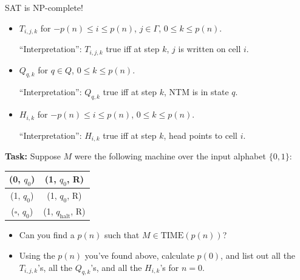 \documentclass{beamer}
\begin{document}
\begin{frame}{SAT is NP-complete!}
\begin{itemize}
    \item $T_{i, j, k}$ for $-p(n) \leq i \leq p(n)$, $j \in \Gamma$, $0 \leq k \leq p(n)$.\pause
    
    ``Interpretation'': $T_{i, j, k}$ true iff at step $k$, $j$ is written on cell $i$.\pause
    \item $Q_{q, k}$ for $q \in Q$, $0 \leq k \leq p(n)$.\pause
    
    ``Interpretation'': $Q_{q, k}$ true iff at step $k$, NTM is in state $q$.\pause
    \item $H_{i, k}$ for $-p(n) \leq i \leq p(n)$, $0 \leq k \leq p(n)$.\pause
    
    ``Interpretation'': $H_{i, k}$ true iff at step $k$, head points to cell $i$.\pause
\end{itemize}

\textbf{Task:} Suppose $M$ were the following machine over the input alphabet $\{0,1\}$:
\begin{center}
    \begin{tabular}{c|c}
        (0, $q_0$) &  (1, $q_0$, R)\\
        \hline
        (1, $q_0$) &  (1, $q_0$, R)\\
        \hline
        ($\square$, $q_0$) &  (1, $q_\text{halt}$, R)\\
    \end{tabular}
\end{center}

\begin{itemize}
    \item Can you find a $p(n)$ such that $M \in \mathrm{TIME}(p(n))$? \pause
    \item Using the $p(n)$ you've found above, calculate $p(0)$, and list out all the $T_{i, j, k}$'s, all the $Q_{q, k}$'s, and all the $H_{i, k}$'s for $n = 0$.
\end{itemize}

\end{frame}
\end{document}
